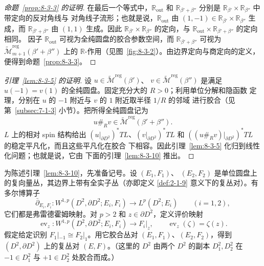\begin{proof}[命题~\ref{prop:8-3-3} 的证明]


在最后一个等式中，$\mathbb R_{\mathrm{out}}$ 和
$\mathbb R_{\beta'+\beta''}$ 分别是
$\mathbb R_{\beta'}\times\mathbb R_{\beta''}$ 中带定向的反对角线与
对角线子流形；也就是说，$\mathbb R_{\mathrm{out}}$ 由
$(1,-1)\in\mathbb R_{\beta'}\times\mathbb R_{\beta''}$ 生成，而
$\mathbb R_{\beta'+\beta''}$ 由 $(1,1)$ 生成。因此
$\mathbb R_{\beta'}\times\mathbb R_{\beta''}$ 的定向，与
$\mathbb R_{\mathrm{out}}\times\mathbb R_{\beta'+\beta''}$ 的定向相同。
因子 $\mathbb R_{\mathrm{out}}$ 可视为全纯圆盘的胶合参数空间，而
$\mathbb R_{\beta'+\beta''}$ 可视为
$\widetilde{\mathcal M}_{m+1}^{\mathrm{reg}}(\beta'+\beta'')$ 上的
$\mathbb R$-作用（见图~\ref{fig:8-3-2}）。由边界定向与商定向的定义，
便得到命题~\ref{prop:8-3-3}。
\end{proof}

\begin{proof}[引理~\ref{lem:8-3-5} 的证明]
设
$u\in\widetilde{\mathcal M}^{\mathrm{reg}}(\beta')$、
$v\in\widetilde{\mathcal M}^{\mathrm{reg}}(\beta'')$ 是满足
$u(-1)=v(1)$ 的全纯圆盘。固定充分大的 $R>0$；利用单位分解和隐函数
定理，分别在 $u$ 的 $-1$ 附近与 $v$ 的 $1$ 附近取半径 $1/R$ 的邻域
进行胶合（见第~\ref{subsec:7-1-3} 小节）。把所得全纯圆盘记为
\[
 u\#_Rv\in
 \widetilde{\mathcal M}^{\mathrm{reg}}(\beta'+\beta'').
\]
$L$ 上的相对 spin 结构给出
$(u|_{\partial D^2})^*TL$、$(v|_{\partial D^2})^*TL$ 和
$((u\#_Rv)|_{\partial D^2})^*TL$ 的稳定平凡化，而且这些平凡化在胶合
下相容。因此引理~\ref{lem:8-3-5} 化归到线性化问题；也就是说，它由
下面的引理~\ref{lem:8-3-10} 推出。
\end{proof}

为陈述引理~\ref{lem:8-3-10}，先准备记号。设 $(E_1,F_1)$、
$(E_2,F_2)$ 是单位圆盘上的复向量丛，其边界上带有全实子丛（亦即定义
\ref{def:2-1-9} 意义下的复丛对）。有多尔博算子
\[
 \bar\partial_{E_i,F_i}\colon
 W^{1,p}(D^2,\partial D^2;E_i,F_i)
 \longrightarrow L^p(D^2;E_i)
 \qquad(i=1,2),
\]
它们都是弗雷德霍姆映射。对 $p>2$ 和 $z\in\partial D^2$，定义评价映射
\[
 \operatorname{ev}_z\colon
 W^{1,p}(D^2,\partial D^2;E_i,F_i)
 \longrightarrow F_i|_z,
 \qquad \operatorname{ev}_z(\zeta)=\zeta(z).
\]
假定给定识别 $F_1|_{-1}\cong F_2|_1$。用它胶合丛对
$(E_1,F_1)$、$(E_2,F_2)$，得到 $(D^2,\partial D^2)$ 上的复丛对
$(E,F)$。（这里的 $D^2$ 由两个 $D^2$ 的副本 $D_1^2,D_2^2$ 在
$-1\in D_1^2$ 与 $+1\in D_2^2$ 处胶合而成。）

